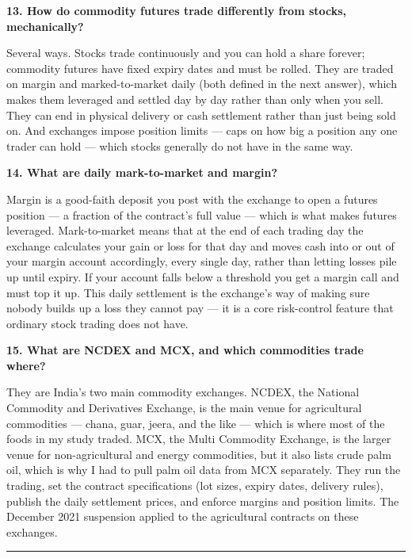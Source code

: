 \documentclass[11pt]{article}
\newcommand{\Q}[1]{\medskip\noindent\textbf{#1}\par}
\newcommand{\A}{\noindent}
\begin{document}
\Q{13. How do commodity futures trade differently from stocks, mechanically?}
\A Several ways. Stocks trade continuously and you can hold a share forever; commodity futures have
fixed expiry dates and must be rolled. They are traded on margin and marked-to-market daily (both
defined in the next answer), which makes them leveraged and settled day by day rather than only when
you sell. They can end in physical delivery or cash settlement rather than just being sold on. And
exchanges impose position limits --- caps on how big a position any one trader can hold --- which
stocks generally do not have in the same way.

\Q{14. What are daily mark-to-market and margin?}
\A Margin is a good-faith deposit you post with the exchange to open a futures position --- a fraction
of the contract's full value --- which is what makes futures leveraged. Mark-to-market means that at
the end of each trading day the exchange calculates your gain or loss for that day and moves cash into
or out of your margin account accordingly, every single day, rather than letting losses pile up until
expiry. If your account falls below a threshold you get a margin call and must top it up. This daily
settlement is the exchange's way of making sure nobody builds up a loss they cannot pay --- it is a
core risk-control feature that ordinary stock trading does not have.

\Q{15. What are NCDEX and MCX, and which commodities trade where?}
\A They are India's two main commodity exchanges. NCDEX, the National Commodity and Derivatives
Exchange, is the main venue for agricultural commodities --- chana, guar, jeera, and the like ---
which is where most of the foods in my study traded. MCX, the Multi Commodity Exchange, is the larger
venue for non-agricultural and energy commodities, but it also lists crude palm oil, which is why I
had to pull palm oil data from MCX separately. They run the trading, set the contract specifications
(lot sizes, expiry dates, delivery rules), publish the daily settlement prices, and enforce margins
and position limits. The December 2021 suspension applied to the agricultural contracts on these
exchanges.

\bigskip
\hrule
\medskip
\end{document}
